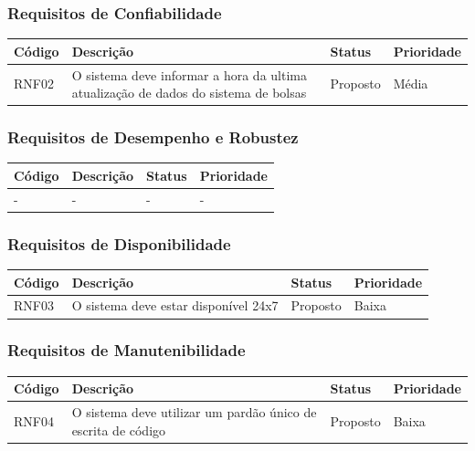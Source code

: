 \documentclass[a4paper, 12pt]{article}
\begin{document}
\subsubsection{Requisitos de Confiabilidade}
\begin{table}[ht]
	\centering

	\begin{tabular}{p{2cm}p{7cm}p{2cm}p{2cm}}
		\hline
		\cellcolor{gray}Código&\cellcolor{gray}Descrição&\cellcolor{gray}Status&\cellcolor{gray}Prioridade  \\
		\hline
        RNF02&O sistema deve informar a hora da ultima atualiza\c{c}\~{a}o de dados do sistema de bolsas&Proposto&M\'{e}dia\\
		\hline
	\end{tabular}
\end{table}%
\subsubsection{Requisitos de Desempenho e Robustez}
\begin{table}[ht]
	\rowcolors{1}{}{}
	\centering

	\begin{tabular}{p{2cm}p{7cm}p{2cm}p{2cm}}
		\hline
		\cellcolor{gray}Código&\cellcolor{gray}Descrição&\cellcolor{gray}Status&\cellcolor{gray}Prioridade  \\
		\hline
		-&-&-&-\\
		\hline
	\end{tabular}
\end{table}
\subsubsection{Requisitos de Disponibilidade}
\begin{table}[ht]
	\centering

	\begin{tabular}{p{2cm}p{7cm}p{2cm}p{2cm}}
		\hline
		\cellcolor{gray}Código&\cellcolor{gray}Descrição&\cellcolor{gray}Status&\cellcolor{gray}Prioridade  \\
		\hline
		RNF03&O sistema deve estar dispon\'{i}vel 24x7&Proposto&Baixa\\
		\hline
	\end{tabular}
\end{table}
\subsubsection{Requisitos de Manutenibilidade}
\begin{table}[ht]
	\centering

	\begin{tabular}{p{2cm}p{7cm}p{2cm}p{2cm}}
		\hline
		\cellcolor{gray}Código&\cellcolor{gray}Descrição&\cellcolor{gray}Status&\cellcolor{gray}Prioridade  \\
		\hline
		RNF04&O sistema deve utilizar um pard\~{a}o \'{u}nico de escrita de c\'{o}digo&Proposto&Baixa\\
		\hline
	\end{tabular}
\end{table}%
\end{document}
